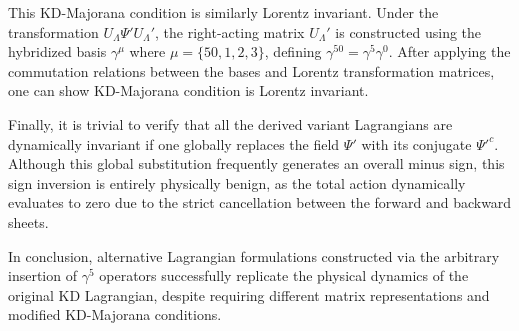 This KD-Majorana condition is similarly Lorentz invariant. Under the transformation $U_\Lambda\Psi'U_\Lambda'$, the right-acting matrix $U_\Lambda'$ is constructed using the hybridized basis $\gamma^\mu$ where $\mu=\{50,1,2,3\}$, defining $\gamma^{50}=\gamma^5\gamma^0$. After applying the commutation relations between the bases and Lorentz transformation matrices, one can show KD-Majorana condition is Lorentz invariant.

Finally, it is trivial to verify that all the derived variant Lagrangians are dynamically invariant if one globally replaces the field $\Psi'$ with its conjugate $\Psi'^c$. Although this global substitution frequently generates an overall minus sign, this sign inversion is entirely physically benign, as the total action dynamically evaluates to zero due to the strict cancellation between the forward and backward sheets.

In conclusion, alternative Lagrangian formulations constructed via the arbitrary insertion of $\gamma^5$ operators successfully replicate the physical dynamics of the original KD Lagrangian, despite requiring different matrix representations and modified KD-Majorana conditions.



\printbibliography[heading=subbibintoc, title={References for Chapter \thechapter}]